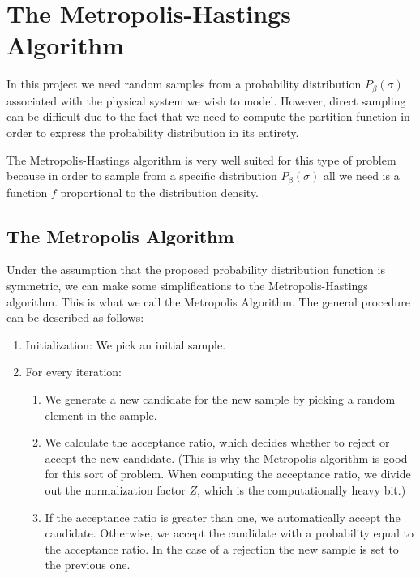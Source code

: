 \section{The Metropolis-Hastings Algorithm}

In this project we need random samples from a probability distribution
$P_\beta(\sigma)$ associated with the physical system we wish to model.
However, direct sampling can be difficult due to the fact that we need to
compute the partition function in order to express the probability distribution
in its entirety.

The Metropolis-Hastings algorithm is very well suited for this type of problem
because in order to sample from a specific distribution $P_\beta(\sigma)$ all
we need is a function $f$ proportional to the distribution density.

\subsection{The Metropolis Algorithm}
\label{sub:the_metropolis_algorithm}

Under the assumption that the proposed probability distribution function is
symmetric, we can make some simplifications to the Metropolis-Hastings
algorithm. This is what we call the Metropolis Algorithm.  The general
procedure can be described as follows:

\begin{enumerate}
  \item Initialization: We pick an initial sample.
  \item For every iteration: \\
    \begin{enumerate}
      \item We generate a new candidate for the new sample by picking a random element in the sample. 
      \item We calculate the acceptance ratio, which decides whether to reject
        or accept the new candidate. (This is why the Metropolis algorithm is
        good for this sort of problem. When computing the acceptance ratio, we
        divide out the normalization factor $Z$, which is the computationally
        heavy bit.)
      \item If the acceptance ratio is greater than one, we automatically
        accept the candidate. Otherwise, we accept the candidate with a
        probability equal to the acceptance ratio. In the case of a rejection
        the new sample is set to the previous one.
    \end{enumerate} 
\end{enumerate}
